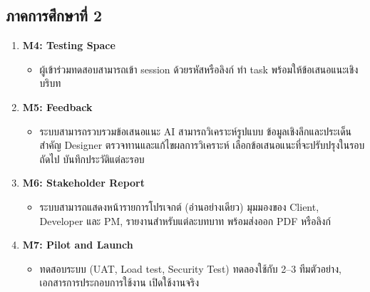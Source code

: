 \subsection{ภาคการศึกษาที่ 2}
\begin{enumerate}
  \item \textbf{M4: Testing Space}
    \begin{itemize}
      \item ผู้เข้าร่วมทดสอบสามารถเข้า session ด้วยรหัสหรือลิงก์ ทำ task พร้อมให้ข้อเสนอแนะเชิงบริบท
    \end{itemize}
  \item \textbf{M5: Feedback}
    \begin{itemize}
      \item ระบบสามารถรวบรวมข้อเสนอแนะ AI สามารถวิเคราะห์รูปแบบ ข้อมูลเชิงลึกและประเด็นสำคัญ Designer ตรวจทานและแก้ไขผลการวิเคราะห์ เลือกข้อเสนอแนะที่จะปรับปรุงในรอบถัดไป บันทึกประวัติแต่ละรอบ
    \end{itemize}
  \item \textbf{M6: Stakeholder Report}
    \begin{itemize}
      \item ระบบสามารถแสดงหน้ารายการโปรเจกต์ (อ่านอย่างเดียว) มุมมองของ Client, Developer และ PM, รายงานสำหรับแต่ละบทบาท พร้อมส่งออก PDF หรือลิงก์
    \end{itemize}
  \item \textbf{M7: Pilot and Launch}
    \begin{itemize}
      \item ทดสอบระบบ (UAT, Load test, Security Test) ทดลองใช้กับ 2–3 ทีมตัวอย่าง, เอกสารการประกอบการใช้งาน เปิดใช้งานจริง
    \end{itemize}
\end{enumerate}
